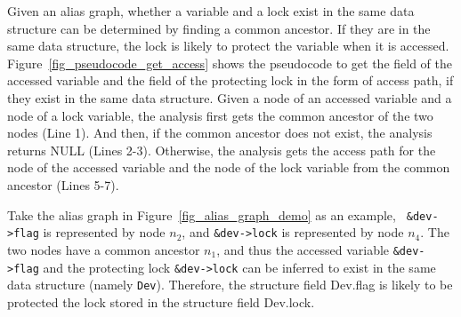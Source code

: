 Given an alias graph, whether a variable and a lock exist in the same data 
structure can be determined by finding a common ancestor. If they are in the 
same data structure, the lock is likely to protect the variable when it is 
accessed. Figure~\ref{fig_pseudocode_get_access} shows the pseudocode to 
get the field of the accessed variable and the field of the protecting lock in 
the form of access path, if they exist in the same data structure. Given a node 
of an accessed variable and a node of a lock variable, the analysis first gets 
the common ancestor of the two nodes (Line 1). And then, if the common ancestor 
does not exist, the analysis returns NULL (Lines 2-3). Otherwise, the analysis 
gets the access path for the node of the accessed variable and the node of the 
lock variable from the common ancestor (Lines 5-7).


Take the alias graph in Figure~\ref{fig_alias_graph_demo} as an example, {\tt 
\&dev->flag} is represented by node $\mathit{n_2}$, and {\tt \&dev->lock} is 
represented by node $\mathit{n_4}$. The two nodes have a common ancestor 
$\mathit{n_1}$, and thus the accessed variable {\tt \&dev->flag} and the 
protecting lock {\tt \&dev->lock} can be inferred to exist in the same data 
structure (namely {\tt Dev}). Therefore, the structure field Dev.flag is likely 
to be protected the lock stored in the structure field Dev.lock.

